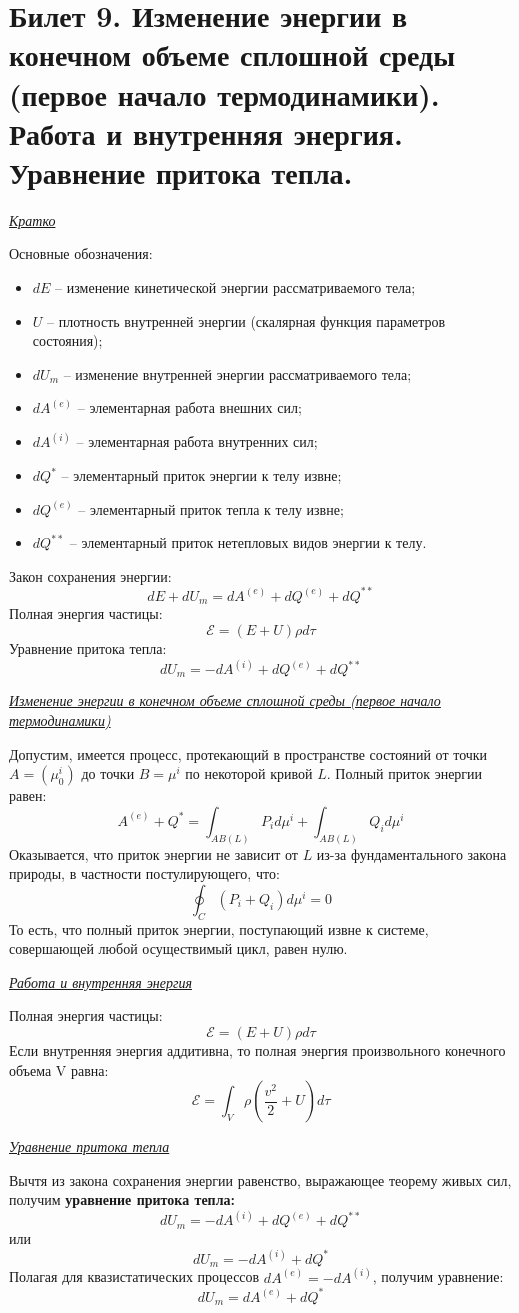 \newpage
\newpage
\section {Билет 9. Изменение энергии в конечном объеме сплошной среды (первое начало термодинамики). Работа и внутренняя энергия. Уравнение притока тепла.}
\begin{center}
	\textit{\underline{Кратко}}
\end{center}
Основные обозначения:
\begin{itemize}
    \item $dE$ -- изменение кинетической энергии рассматриваемого тела;
    \item $U$ -- плотность внутренней энергии (скалярная функция параметров состояния);
    \item $dU_m$ -- изменение внутренней энергии рассматриваемого тела;
    \item $dA^{(e)}$ -- элементарная работа внешних сил;
    \item $dA^{(i)}$ -- элементарная работа внутренних сил;
    \item $dQ^{*}$ -- элементарный приток энергии к телу извне;
    \item $dQ^{(e)}$ -- элементарный приток тепла к телу извне;
    \item $dQ^{**}$ -- элементарный приток нетепловых видов энергии к телу.
\end{itemize}
Закон сохранения энергии:
$$
dE + dU_m = dA^{(e)} + dQ^{(e)} + dQ^{**}
$$
Полная энергия частицы:
$$
\mathcal{E} = (E + U)\rho d\tau
$$
Уравнение притока тепла:
$$
dU_m = -dA^{(i)} + dQ^{(e)} + dQ^{**}
$$

\begin{center}
	\textit{\underline{Изменение энергии в конечном объеме сплошной среды (первое начало термодинамики)}}
\end{center}
Допустим, имеется процесс, протекающий в пространстве состояний от точки $A = (\mu^i_0)$ до точки $B = \mu^i$ по некоторой кривой $L$. Полный приток энергии равен:
$$
A^{(e)} + Q^{*} = \int_{AB(L)}P_id\mu^i + \int_{AB(L)}Q_id\mu^i
$$
Оказывается, что приток энергии не зависит от $L$ из-за фундаментального закона природы, в частности постулирующего, что:
$$
\oint_{C}(P_i + Q_i)d\mu^i = 0
$$
То есть, что полный приток энергии, поступающий извне к системе, совершающей любой осуществимый цикл, равен нулю.
\begin{center}
	\textit{\underline{Работа и внутренняя энергия}}
\end{center}
Полная энергия частицы:
$$
\mathcal{E} = (E + U)\rho d\tau
$$
Если внутренняя энергия аддитивна, то полная энергия произвольного конечного объема V равна:
$$
\mathcal{E} = \int_{V}\rho(\frac{v^2}{2} + U)d\tau
$$
\begin{center}
	\textit{\underline{Уравнение притока тепла}}
\end{center}
Вычтя из закона сохранения энергии равенство, выражающее теорему живых сил, получим \textbf{уравнение притока тепла:}
$$
dU_m = -dA^{(i)} + dQ^{(e)} + dQ^{**}
$$
или
$$
dU_m = -dA^{(i)} + dQ^{*}
$$
Полагая для квазистатических процессов $dA^{(e)} = -dA^{(i)}$, получим уравнение:
$$
dU_m = dA^{(e)} + dQ^{*}
$$
